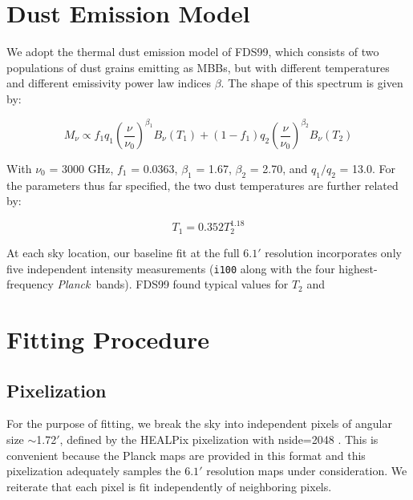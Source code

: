 \documentclass{emulateapj}
\newcommand{\PLANCK}{{\it Planck}}
\begin{document}
\section{Dust Emission Model}
\label{sec:modeling}

We adopt the thermal dust emission model of FDS99, which consists of two 
populations of dust grains emitting as MBBs, but with different temperatures 
and different emissivity power law indices $\beta$. The shape of this spectrum 
is given by:

\begin{equation}
M_{\nu} \propto f_{1}q_{1}(\frac{\nu}{\nu_{0}})^{\beta_1}B_{\nu}(T_1) + (1-f_{1})q_{2}(\frac{\nu}{\nu_0})^{\beta_2}B_{\nu}(T_2)
\end{equation}

With $\nu_0$ = 3000 GHz, $f_{1}$ = 0.0363, $\beta_1$ = 1.67, $\beta_2$ = 2.70, 
and $q_1/q_2$ = 13.0. For the parameters thus far specified, the two dust 
temperatures are further related by:

\begin{equation}
T_1 = 0.352T_2^{1.18}
\end{equation}

At each sky location, our baseline fit at the full $6.1'$ resolution 
incorporates only five independent intensity measurements (\verb|i100| along 
with the four highest-frequency \PLANCK~bands). FDS99 found typical values for 
$T_2$ and 


\section{Fitting Procedure}
\label{sec:fitting}

\subsection{Pixelization}
\label{sec:pix}
For the purpose of fitting, we break the sky into independent pixels of 
angular size $\sim$1.72$'$, defined by the HEALPix pixelization with nside=2048
\citep{healpix}. This is convenient because the Planck maps are provided in 
this format and this pixelization adequately samples the $6.1'$ resolution maps
under consideration. We reiterate that each pixel is fit independently of 
neighboring pixels.
\end{document}
